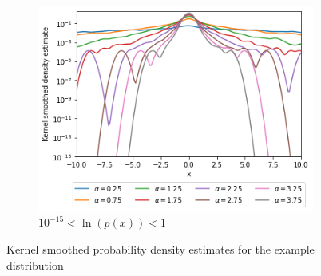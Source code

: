 \documentclass[a4paper]{article}
\begin{document}
\begin{figure}[h]
\begin{subfigure}[b]{0.3\textwidth}
    \end{subfigure}
    \hfill
    \begin{subfigure}[b]{0.3\textwidth}
        \centering
        \includegraphics[width=\textwidth]{figures/nonstandard_distribution_ksdensity_log_far.png}
        \caption{$10^{-15} < \ln(p(x)) < 1$}
        \label{fig:nonstandard_distribution_ksdensity_log_far}
    \end{subfigure}
    \caption{Kernel smoothed probability density estimates for the example distribution}
    \label{fig:nonstandard_distribution_kernel_smoothed}
\end{figure}


\newpage

\end{document}
